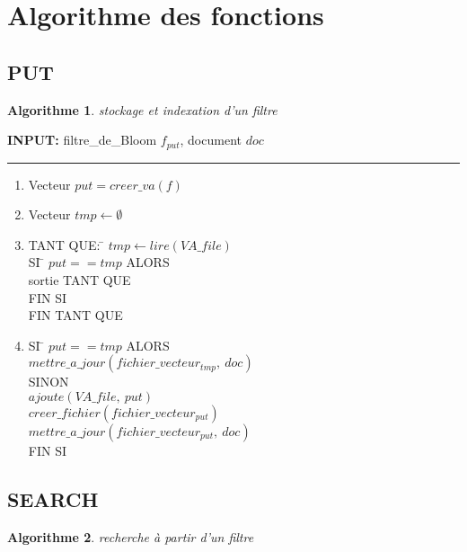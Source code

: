 \documentclass[a4paper,12pt]{report}
\begin{document}
\section{Algorithme des fonctions}
	\subsection{PUT}
\newtheorem{algorithme}{Algorithme}
\begin{algorithme}
	stockage et indexation d'un filtre
\end{algorithme}

\begin{flushleft}
	\begin{framed}
		\textbf{INPUT:} filtre\_de\_Bloom $f_{put}$, document $doc$
		\noindent\rule{\linewidth}{0.5pt}

		\begin{enumerate}
		\item Vecteur $put = creer\_va(f) $
		\item Vecteur $tmp \leftarrow \emptyset$
		\item 
		\begin{tabbing}
			TANT QUE: \= $tmp \leftarrow lire(VA\_file)$ \\
					\> SI \= $put == tmp$ ALORS\\
					\> \> sortie TANT QUE\\
					\> FIN SI\\
			FIN TANT QUE
	    	\end{tabbing}
		\item
		\begin{tabbing}
			SI \= $put == tmp $ ALORS\\
			\> $mettre\_a\_jour (fichier\_vecteur_{tmp},\ doc)$\\
			SINON\\
			\> $ajoute(VA\_file,\ put)$\\
			\> $creer\_fichier(fichier\_vecteur_{put})$\\
			\> $mettre\_a\_jour (fichier\_vecteur_{put},\ doc)$\\
			FIN SI
		\end{tabbing}
		\end{enumerate}
	\end{framed}
\end{flushleft}

\subsection{SEARCH}
\begin{algorithme}
	recherche à partir d'un filtre
\end{algorithme} 
\end{document}
